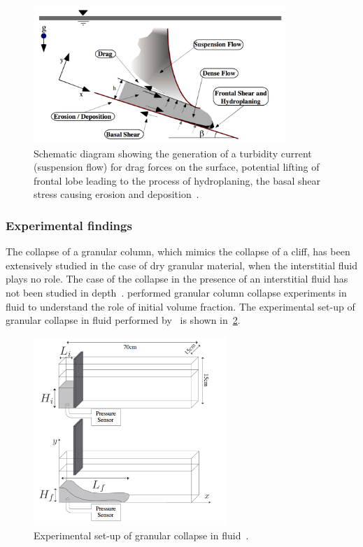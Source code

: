 \begin{figure}[tbhp]
\centering
\includegraphics[width=0.85\textwidth]{Submarine_landslide}
\caption[Complex interactions in a submarine landslide.]{Schematic diagram 
showing the generation of a turbidity current (suspension flow) for drag forces 
on the surface, potential lifting of frontal lobe leading to the process of 
hydroplaning, the basal shear stress causing erosion and 
deposition~\citep{Locat2002}.}
\label{fig:Submarine_landslide}
\end{figure}

\subsubsection{Experimental findings}

The collapse of a granular column, which mimics the collapse of a cliff, has 
been extensively studied in the case of dry granular material, when the 
interstitial fluid plays no role. The case of the collapse in the presence of 
an interstitial fluid has not been studied in depth~\citep{Topin2012}. 
\citet{Rondon2011} performed granular column collapse experiments in fluid to 
understand the role of initial volume fraction. The experimental set-up 
of granular collapse in fluid performed by~\citet{Rondon2011} is shown 
in~\cref{fig:Fluid_Collapse}.

\begin{figure}[htbp]
\centering
\includegraphics[width=0.65\textwidth]{Fluid_Collapse}
\caption{Experimental set-up of granular collapse in fluid~\citep{Rondon2011}.}
\label{fig:Fluid_Collapse}
\end{figure}

